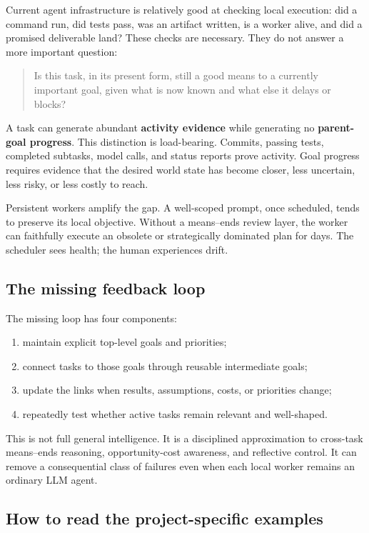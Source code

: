 \documentclass[11pt,letterpaper]{article}
\newcommand{\term}[1]{\textbf{#1}}
\begin{document}
Current agent infrastructure is relatively good at checking local execution:
did a command run, did tests pass, was an artifact written, is a worker alive,
and did a promised deliverable land? These checks are necessary. They do not
answer a more important question:

\begin{quote}
Is this task, in its present form, still a good means to a currently important
goal, given what is now known and what else it delays or blocks?
\end{quote}

A task can generate abundant \term{activity evidence} while generating no
\term{parent-goal progress}. This distinction is load-bearing. Commits, passing
tests, completed subtasks, model calls, and status reports prove activity.
Goal progress requires evidence that the desired world state has become closer,
less uncertain, less risky, or less costly to reach.

Persistent workers amplify the gap. A well-scoped prompt, once scheduled,
tends to preserve its local objective. Without a means--ends review layer, the
worker can faithfully execute an obsolete or strategically dominated plan for
days. The scheduler sees health; the human experiences drift.

\subsection{The missing feedback loop}

The missing loop has four components:

\begin{enumerate}
  \item maintain explicit top-level goals and priorities;
  \item connect tasks to those goals through reusable intermediate goals;
  \item update the links when results, assumptions, costs, or priorities change;
  \item repeatedly test whether active tasks remain relevant and well-shaped.
\end{enumerate}

This is not full general intelligence. It is a disciplined approximation to
cross-task means--ends reasoning, opportunity-cost awareness, and reflective
control. It can remove a consequential class of failures even when each local
worker remains an ordinary LLM agent.

\subsection{How to read the project-specific examples}
\end{document}

